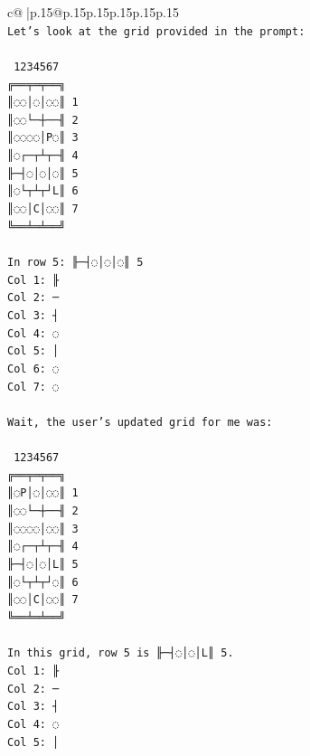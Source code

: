 \documentclass{article}
\begin{document}
{\begin{supertabular}{c@{$\;$}|p{.15\linewidth}@{}p{.15\linewidth}p{.15\linewidth}p{.15\linewidth}p{.15\linewidth}p{.15\linewidth}}
{{{\\ 
\texttt{Let's look at the grid provided in the prompt:} \\
\\ 
\texttt{ 1234567} \\
\texttt{╔══╤═╤══╗} \\
\texttt{║◌◌│◌│◌◌║ 1} \\
\texttt{║◌◌└─┼──╢ 2} \\
\texttt{║◌◌◌◌│P◌║ 3} \\
\texttt{║◌┌─┬┴┬─╢ 4} \\
\texttt{╟─┤◌│◌│◌║ 5} \\
\texttt{║◌└┬┴┬┘L║ 6} \\
\texttt{║◌◌│C│◌◌║ 7} \\
\texttt{╚══╧═╧══╝} \\
\\ 
\texttt{In row 5: ╟─┤◌│◌│◌║ 5} \\
\texttt{Col 1: ╟} \\
\texttt{Col 2: ─} \\
\texttt{Col 3: ┤} \\
\texttt{Col 4: ◌} \\
\texttt{Col 5: │} \\
\texttt{Col 6: ◌} \\
\texttt{Col 7: ◌} \\
\\ 
\texttt{Wait, the user's updated grid for me was:} \\
\\ 
\texttt{ 1234567} \\
\texttt{╔══╤═╤══╗} \\
\texttt{║◌P│◌│◌◌║ 1} \\
\texttt{║◌◌└─┼──╢ 2} \\
\texttt{║◌◌◌◌│◌◌║ 3} \\
\texttt{║◌┌─┬┴┬─╢ 4} \\
\texttt{╟─┤◌│◌│L║ 5} \\
\texttt{║◌└┬┴┬┘◌║ 6} \\
\texttt{║◌◌│C│◌◌║ 7} \\
\texttt{╚══╧═╧══╝} \\
\\ 
\texttt{In this grid, row 5 is ╟─┤◌│◌│L║ 5.} \\
\texttt{Col 1: ╟} \\
\texttt{Col 2: ─} \\
\texttt{Col 3: ┤} \\
\texttt{Col 4: ◌} \\
\texttt{Col 5: │} \\
}}}
\end{supertabular}}
\end{document}

